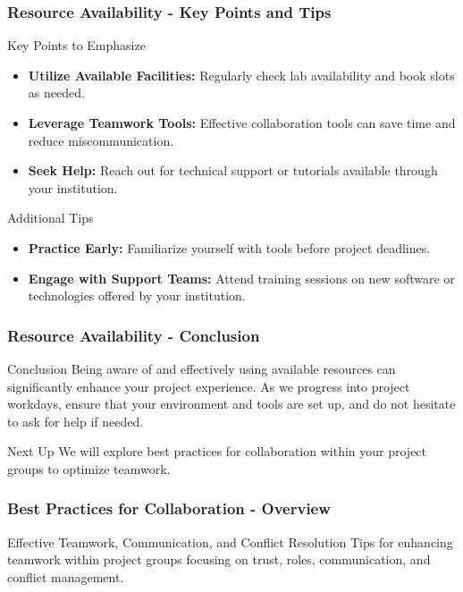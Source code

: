 \documentclass[aspectratio=169]{beamer}
\begin{document}
\begin{frame}[fragile]
    \frametitle{Resource Availability - Key Points and Tips}
    \begin{block}{Key Points to Emphasize}
        \begin{itemize}
            \item \textbf{Utilize Available Facilities:} Regularly check lab availability and book slots as needed.
            \item \textbf{Leverage Teamwork Tools:} Effective collaboration tools can save time and reduce miscommunication.
            \item \textbf{Seek Help:} Reach out for technical support or tutorials available through your institution.
        \end{itemize}
    \end{block}
    
    \begin{block}{Additional Tips}
        \begin{itemize}
            \item \textbf{Practice Early:} Familiarize yourself with tools before project deadlines.
            \item \textbf{Engage with Support Teams:} Attend training sessions on new software or technologies offered by your institution.
        \end{itemize}
    \end{block}
\end{frame}

\begin{frame}[fragile]
    \frametitle{Resource Availability - Conclusion}
    \begin{block}{Conclusion}
        Being aware of and effectively using available resources can significantly enhance your project experience. 
        As we progress into project workdays, ensure that your environment and tools are set up, and do not hesitate to ask for help if needed.
    \end{block}
    
    \begin{block}{Next Up}
        We will explore best practices for collaboration within your project groups to optimize teamwork.
    \end{block}
\end{frame}

\begin{frame}[fragile]
    \frametitle{Best Practices for Collaboration - Overview}
    \begin{block}{Effective Teamwork, Communication, and Conflict Resolution}
        Tips for enhancing teamwork within project groups focusing on trust, roles, communication, and conflict management.
    \end{block}
\end{frame}
\end{document}
